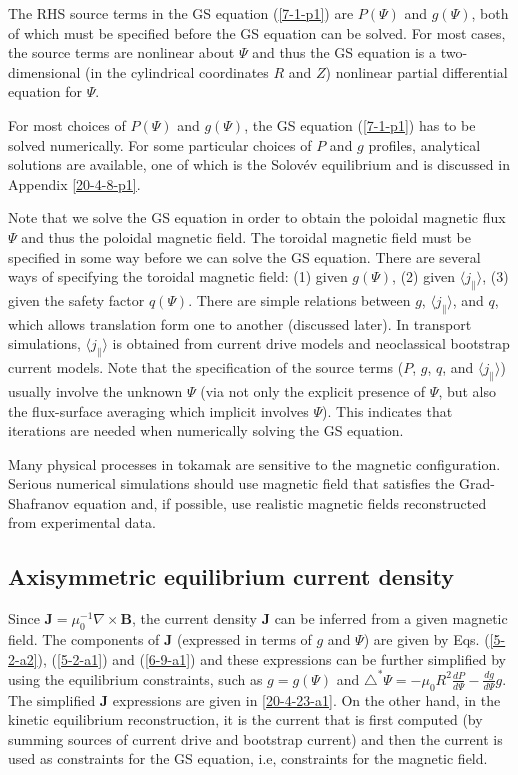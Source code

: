 \documentclass{llncs}
\begin{document}
The RHS source terms in the GS equation (\ref{7-1-p1}) are $P (\Psi)$ and $g
(\Psi)$, both of which must be specified before the GS equation can be solved.
For most cases, the source terms are nonlinear about $\Psi$ and thus the GS
equation is a two-dimensional (in the cylindrical coordinates $R$ and $Z$)
nonlinear partial differential equation for $\Psi$.

For most choices of $P (\Psi)$ and $g (\Psi)$, the GS equation (\ref{7-1-p1})
has to be solved numerically. For some particular choices of $P$ and $g$
profiles, analytical solutions are available, one of which is the Solov{\'e}v
equilibrium and is discussed in Appendix \ref{20-4-8-p1}.

Note that we solve the GS equation in order to obtain the poloidal magnetic
flux $\Psi$ and thus the poloidal magnetic field. The toroidal magnetic field
must be specified in some way before we can solve the GS equation. There are
several ways of specifying the toroidal magnetic field: (1) given $g (\Psi)$,
(2) given $\langle j_{\parallel} \rangle$, (3) given the safety factor $q
(\Psi)$. There are simple relations between $g$, $\langle j_{\parallel}
\rangle$, and $q$, which allows translation form one to another (discussed
later). In transport simulations, $\langle j_{\parallel} \rangle$ is obtained
from current drive models and neoclassical bootstrap current models. Note that
the specification of the source terms ($P$, $g$, $q$, and $\langle
j_{\parallel} \rangle$) usually involve the unknown $\Psi$ (via not only the
explicit presence of $\Psi$, but also the flux-surface averaging which
implicit involves $\Psi$). This indicates that iterations are needed when
numerically solving the GS equation.

Many physical processes in tokamak are sensitive to the magnetic
configuration. Serious numerical simulations should use magnetic field that
satisfies the Grad-Shafranov equation and, if possible, use realistic magnetic
fields reconstructed from experimental data.

\subsection{Axisymmetric equilibrium current density}

Since $\mathbf{J}= \mu_0^{- 1} \nabla \times \mathbf{B}$, the current density
$\mathbf{J}$ can be inferred from a given magnetic field. The components of
$\mathbf{J}$ (expressed in terms of $g$ and $\Psi$) are given by Eqs.
(\ref{5-2-a2}), (\ref{5-2-a1}) and (\ref{6-9-a1}) and these expressions can be
further simplified by using the equilibrium constraints, such as $g = g
(\Psi)$ and $\triangle^{\ast} \Psi = - \mu_0 R^2 \frac{d P}{d \Psi} - \frac{d
g}{d \Psi} g$. The simplified $\mathbf{J}$ expressions are given in
\ref{20-4-23-a1}. On the other hand, in the kinetic equilibrium
reconstruction{\cite{li2013}}, it is the current that is first computed (by
summing sources of current drive and bootstrap current) and then the current
is used as constraints for the GS equation, i.e, constraints for the magnetic
field.
\end{document}
